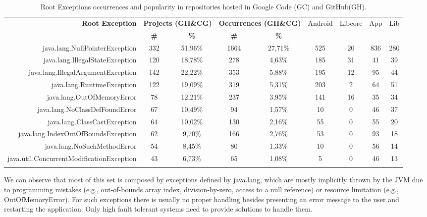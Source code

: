 \documentclass[conference]{IEEEtran}
\begin{document}
\begin{table}
  \centering
  \begin{tabular}{rcccccccc}
    \hline
    \bfseries{Root Exception} &  \multicolumn{2}{c}{\bfseries{Projects (GH\&CG)}} &  \multicolumn{2}{c}{\bfseries{Occurrences (GH\&CG)}} & \textsf{Android} & \textsf{Libcore} & \textsf{App} & \textsf{Lib} \\
    & \bfseries{\#} &  \bfseries{\%} & \bfseries{\# } & \bfseries{\% } &&&&\\
    \hline

java.lang.NullPointerException	&	332	&	51,96\%	&	1664	&	27,71\%	&	525	&	20	&	836	&	280	\\
java.lang.IllegalStateException	&	120	&	18,78\%	&	278	&	4,63\%	&	185	&	31	&	41	&	39	\\
java.lang.IllegalArgumentException	&	142	&	22,22\%	&	353	&	5,88\%	&	195	&	12	&	95	&	44	\\
java.lang.RuntimeException	&	122	&	19,09\%	&	319	&	5,31\%	&	203	&	2	&	64	&	51	\\
java.lang.OutOfMemoryError	&	78	&	12,21\%	&	237	&	3,95\%	&	141	&	16	&	35	&	34	\\
java.lang.NoClassDefFoundError	&	67	&	10,49\%	&	94	&	1,57\%	&	10	&	0	&	46	&	37	\\
java.lang.ClassCastException	&	64	&	10,02\%	&	130	&	2,16\%	&	55	&	0	&	55	&	20	\\
java.lang.IndexOutOfBoundsException	&	62	&	9,70\%	&	166	&	2,76\%	&	53	&	0	&	93	&	18	\\
java.lang.NoSuchMethodError	&	54	&	8,45\%	&	80	&	1,33\%	&	10	&	0	&	56	&	14	\\
java.util.ConcurrentModificationException	&	43	&	6,73\%	&	65	&	1,08\%	&	5	&	0	&	46	&	13	\\
\\

    \hline
  \end{tabular}
\caption{Root Exceptions occurrences and popularity in repositories hosted in Google Code (GC) and GitHub(GH).}
\label{tab:topten}
\end{table}

 

We can observe that most of this set is composed by exceptions defined by java.lang,
which are mostly implicitly thrown by the JVM due to programming mistakes 
(e.g., out-of-bounds array index, division-by-zero, access to a null reference)
 or resource limitation (e.g., OutOfMemoryError).
For such exceptions there is usually no proper handling besides presenting an error message to
 the user and restarting the application. Only high fault tolerant systems need to 
provide solutions to handle them. 
\end{document}
